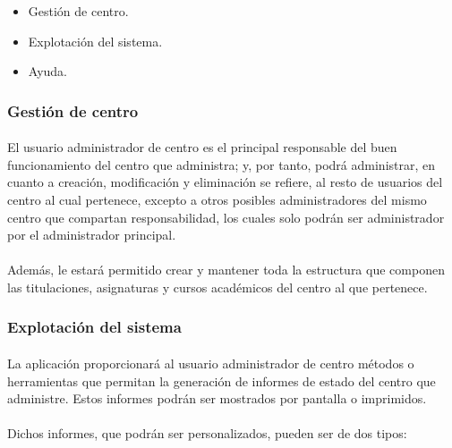       \begin{itemize}
       \item Gestión de centro.
       \item Explotación del sistema.
       \item Ayuda.
      \end{itemize}

      \subsubsection{Gestión de centro}

      \paragraph{}El usuario administrador de centro es el principal responsable
      del buen funcionamiento del centro que administra; y, por tanto, podrá
      administrar, en cuanto a creación, modificación y eliminación se refiere,
      al resto de usuarios del centro al cual pertenece, excepto a otros
      posibles administradores del mismo centro que compartan responsabilidad,
      los cuales solo podrán ser administrador por el administrador principal.

      \paragraph{}Además, le estará permitido crear y mantener toda la
      estructura que componen las titulaciones, asignaturas y cursos
      académicos del centro al que pertenece.

      \subsubsection{Explotación del sistema}

      \paragraph{}La aplicación proporcionará al usuario administrador de centro
      métodos o herramientas que permitan la generación de informes de estado
      del centro que administre. Estos informes podrán ser mostrados por
      pantalla o imprimidos.

      \paragraph{}Dichos informes, que podrán ser personalizados, pueden ser
      de dos tipos:

